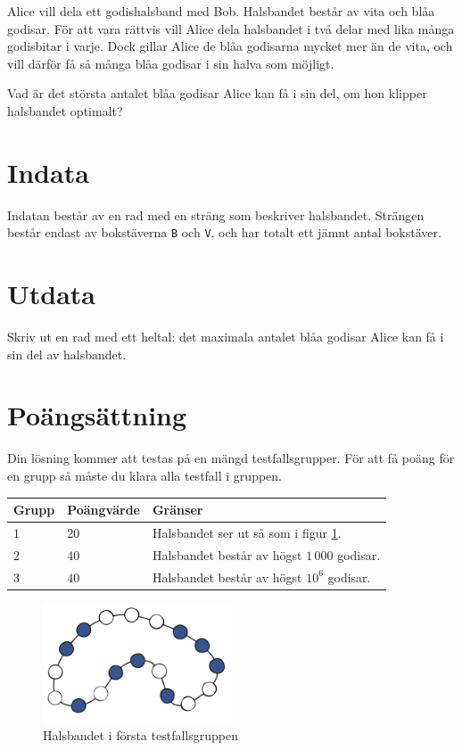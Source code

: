 Alice vill dela ett godishalsband med Bob.
Halsbandet består av vita och blåa godisar.
För att vara rättvis vill Alice dela halsbandet i två
delar med lika många godisbitar i varje.
Dock gillar Alice de blåa godisarna mycket mer än de vita,
och vill därför få så många blåa godisar i sin halva som möjligt.

Vad är det största antalet blåa godisar Alice kan få i sin del,
om hon klipper halsbandet optimalt?

\section*{Indata}
Indatan består av en rad med en sträng som beskriver halsbandet.
Strängen består endast av bokstäverna \texttt{B} och \texttt{V},
och har totalt ett jämnt antal bokstäver.

\section*{Utdata}
Skriv ut en rad med ett heltal: det maximala antalet blåa godisar Alice
kan få i sin del av halsbandet.

\section*{Poängsättning}
Din lösning kommer att testas på en mängd testfallsgrupper.
För att få poäng för en grupp så måste du klara alla testfall i gruppen.

\noindent
\begin{tabular}{| l | l | p{12cm} |}
  \hline
  Grupp & Poängvärde & Gränser \\ \hline
  $1$   & $20$       & Halsbandet ser ut så som i figur \ref{fig:group-1}. \\ \hline
  $2$   & $40$       & Halsbandet består av högst $1\,000$ godisar. \\ \hline
  $3$   & $40$       & Halsbandet består av högst $10^6$ godisar. \\ \hline
\end{tabular}


\begin{figure}[h]
	\centering
\includegraphics[width=0.5\textwidth]{group1}
\caption{Halsbandet i första testfallsgruppen}
\label{fig:group-1}
\end{figure}



